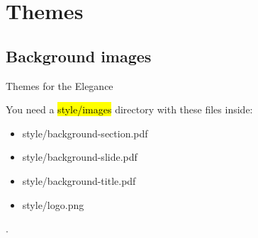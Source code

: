





\maketitle


\section{Themes}

\subsection{Background images}

\begin{xframe}{Themes for the Elegance}

    You need a \hl{style/images} directory
    with these files inside:

    \begin{itemize}
        \item style/background-section.pdf
        \item style/background-slide.pdf
        \item style/background-title.pdf
        \item style/logo.png
    \end{itemize}

\end{xframe}


{
\begin{frame}[plain]
    .
\end{frame}
}


